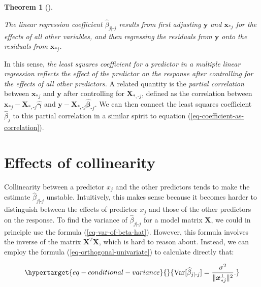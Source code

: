 \documentclass[
  11pt,
  letterpaper,
  oneside]{book}
\theoremstyle{definition}
\theoremstyle{plain}
\newtheorem{theorem}{Theorem}[chapter]
\theoremstyle{plain}
\theoremstyle{plain}
\theoremstyle{remark}
\begin{document}
\begin{theorem}[]\protect\hypertarget{thm-frisch-waugh-lovell}{}\label{thm-frisch-waugh-lovell}

The linear regression coefficient \(\widehat{\beta}_{j|\text{-}j}\)
results from first adjusting \(\boldsymbol{y}\) and
\(\boldsymbol{x}_{*j}\) for the effects of all other variables, and then
regressing the residuals from \(\boldsymbol{y}\) onto the residuals from
\(\boldsymbol{x}_{*j}\).

\end{theorem}

In this sense, \emph{the least squares coefficient for a predictor in a
multiple linear regression reflects the effect of the predictor on the
response after controlling for the effects of all other predictors.} A
related quantity is the \emph{partial correlation} between
\(\boldsymbol{x}_{*j}\) and \(\boldsymbol{y}\) after controlling for
\(\boldsymbol{X}_{*,\text{-}j}\), defined as the correlation between
\(\boldsymbol{x}_{*j} - \boldsymbol{X}_{*,\text{-}j}\boldsymbol{\widehat{\gamma}}\)
and
\(\boldsymbol{y} - \boldsymbol{X}_{*,\text{-}j}\boldsymbol{\widehat{\beta}}_{\text{-}j}\).
We can then connect the least squares coefficient \(\widehat{\beta}_j\)
to this partial correlation in a similar spirit to equation
(\ref{eq-coefficient-as-correlation}).

\hypertarget{effects-of-collinearity}{%
\section{Effects of collinearity}\label{effects-of-collinearity}}

Collinearity between a predictor \(x_j\) and the other predictors tends
to make the estimate \(\widehat{\beta}_{j|\text{-}j}\) unstable.
Intuitively, this makes sense because it becomes harder to distinguish
between the effects of predictor \(x_j\) and those of the other
predictors on the response. To find the variance of
\(\widehat{\beta}_{j|\text{-}j}\) for a model matrix \(\boldsymbol{X}\),
we could in principle use the formula (\ref{eq-var-of-beta-hat}).
However, this formula involves the inverse of the matrix
\(\boldsymbol{X}^T \boldsymbol{X}\), which is hard to reason about.
Instead, we can employ the formula (\ref{eq-orthogonal-univariate}) to
calculate directly that:

\begin{equation}\protect\hypertarget{eq-conditional-variance}{}{
\text{Var}[\widehat{\beta}_{j|\text{-}j}] = \frac{\sigma^2}{\|\boldsymbol{x}_{*j}^\perp\|^2}.
}\label{eq-conditional-variance}\end{equation}
\end{document}
